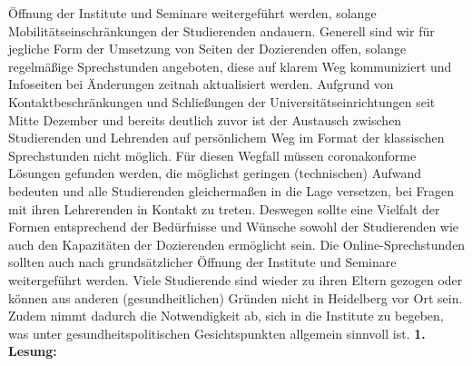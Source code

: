 {        Öffnung der Institute und Seminare weitergeführt werden, solange
        Mobilitätseinschränkungen der Studierenden andauern.
        Generell sind wir für jegliche Form der Umsetzung von Seiten der Dozierenden offen,
        solange regelmäßige Sprechstunden angeboten, diese auf klarem Weg kommuniziert und
        Infoseiten bei Änderungen zeitnah aktualisiert werden.
    }{
        Aufgrund von Kontaktbeschränkungen und Schließungen der Universitätseinrichtungen
        seit Mitte Dezember und bereits deutlich zuvor ist der Austausch zwischen Studierenden
        und Lehrenden auf persönlichem Weg im Format der klassischen Sprechstunden nicht
        möglich. Für diesen Wegfall müssen coronakonforme Lösungen gefunden werden, die
        möglichst geringen (technischen) Aufwand bedeuten und alle Studierenden
        gleichermaßen in die Lage versetzen, bei Fragen mit ihren Lehrerenden in Kontakt zu
        treten. Deswegen sollte eine Vielfalt der Formen entsprechend der Bedürfnisse und
        Wünsche sowohl der Studierenden wie auch den Kapazitäten der Dozierenden
        ermöglicht sein. Die Online-Sprechstunden sollten auch nach grundsätzlicher Öffnung
        der Institute und Seminare weitergeführt werden. Viele Studierende sind wieder zu ihren 
        Eltern gezogen oder können aus anderen (gesundheitlichen) Gründen nicht in Heidelberg
        vor Ort sein. Zudem nimmt dadurch die Notwendigkeit ab, sich in die Institute zu
        begeben, was unter gesundheitspolitischen Gesichtspunkten allgemein sinnvoll ist.
    }{
        \textbf{1. Lesung:}
        \ul{}
    }{
    }
